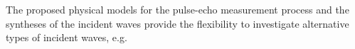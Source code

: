 The proposed physical models for
the pulse-echo measurement process and
the syntheses of
the incident waves provide
the flexibility to
investigate alternative types of
incident waves, e.g.
